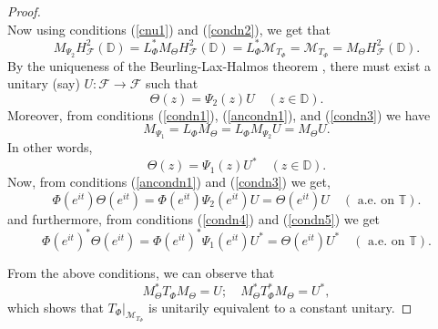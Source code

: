 \documentclass[12pt]{amsart}
\numberwithin{equation}{section}
\theoremstyle{definition}
\newcommand{\D}{\mathbb{D}}
\newcommand{\T}{\mathbb{T}}
\newcommand{\1}{{\mbox{\bf 1}}}
\newcommand{\cle}{\mathcal{E}}
\newcommand{\clf}{\mathcal{F}}
\newcommand{\clm}{\mathcal{M}}
\newcommand{\raro}{\rightarrow}
\begin{document}
\begin{proof}
\begin{equation}
\end{equation}
Now using conditions (\ref{cnu1}) and (\ref{condn2}), we get that
\[
M_{\Psi_2} H_{\clf}^2(\D) = L_{\Phi}^* M_{\Theta} H_{\clf}^2(\D) = L_{\Phi}^*\clm_{T_{\Phi}} = \clm_{T_{\Phi}} = M_{\Theta}H_{\clf}^2(\D).
\]
By the uniqueness of the Beurling-Lax-Halmos theorem \cite[Theorem 2.1, Page 239]{FoFr}, there must exist a unitary (say) $U:\clf \raro \clf$ such that
\begin{equation}\label{condn3}
\Theta(z) = \Psi_2(z) U \quad (z \in \D).
\end{equation}
Moreover, from conditions (\ref{condn1}), (\ref{ancondn1}), and (\ref{condn3}) we have
\[
M_{\Psi_1} = L_{\Phi} M_{\Theta} = L_{\Phi} M_{\Psi_2} U = M_{\Theta}U.
\]
In other words, 
\begin{equation}\label{condn5}
\Theta(z) = \Psi_1(z) U^*  \quad (z \in \D).
\end{equation}
Now, from conditions (\ref{ancondn1}) and (\ref{condn3}) we get,
\begin{equation}\label{imp1}
\Phi(e^{it}) \Theta(e^{it}) =  \Phi(e^{it}) \Psi_2(e^{it}) U  = \Theta(e^{it}) U \quad (\text{ a.e. on }\T).
\end{equation}
and furthermore, from conditions (\ref{condn4}) and (\ref{condn5}) we get
\begin{equation}\label{imp2}
\Phi(e^{it})^* \Theta(e^{it}) =\Phi(e^{it})^* \Psi_1(e^{it}) U^* = \Theta(e^{it}) U^* \quad (\text{ a.e. on }\T).
\end{equation}

From the above conditions, we can observe that 
\[
M_{\Theta}^* T_{\Phi} M_{\Theta} = U; \quad M_{\Theta}^* T_{\Phi}^* M_{\Theta} = U^*,
\]
which shows that $T_{\Phi}|_{\clm_{T_{\Phi}}}$ is unitarily equivalent to a constant unitary. 


\end{proof}
\end{document}

